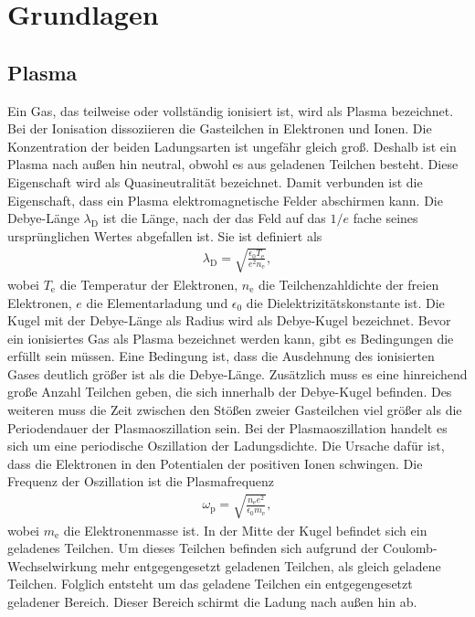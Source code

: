 \section{Grundlagen}
\subsection{Plasma}\label{sec:plasma}
Ein Gas, das teilweise oder vollständig ionisiert ist, wird als Plasma \cite{Plasmaphysik} bezeichnet. Bei der Ionisation dissoziieren die Gasteilchen in Elektronen und Ionen. Die Konzentration der beiden Ladungsarten ist ungefähr gleich groß. Deshalb ist ein Plasma nach außen hin neutral, obwohl es aus geladenen Teilchen besteht. Diese Eigenschaft wird als Quasineutralität bezeichnet. Damit verbunden ist die Eigenschaft, dass ein Plasma elektromagnetische Felder abschirmen kann.
Die Debye-Länge $\lambda_{\mathrm{D}}$ ist die Länge, nach der das Feld auf das $1/e$ fache seines ursprünglichen Wertes abgefallen ist. Sie ist definiert als
\begin{align}
\lambda_{\mathrm{D}}=\sqrt{\frac{\epsilon_0 T_{\mathrm{e}}}{e^2 n_\mathrm{e}}},
\end{align}
wobei $T_{\mathrm{e}}$ die Temperatur der Elektronen, $n_\mathrm{e}$ die Teilchenzahldichte der freien Elektronen, $e$ die Elementarladung und $\epsilon_0$ die Dielektrizitätskonstante ist.
Die Kugel mit der Debye-Länge als Radius wird als Debye-Kugel bezeichnet.
Bevor ein ionisiertes Gas als Plasma bezeichnet werden kann, gibt es Bedingungen die erfüllt sein müssen.  Eine Bedingung ist, dass die Ausdehnung des ionisierten Gases deutlich größer ist als die Debye-Länge. Zusätzlich muss es eine hinreichend große Anzahl Teilchen geben, die sich innerhalb der Debye-Kugel befinden. Des weiteren muss die Zeit zwischen den Stößen zweier Gasteilchen viel größer als die Periodendauer der Plasmaoszillation sein. Bei der Plasmaoszillation handelt es sich um eine periodische Oszillation der Ladungsdichte. Die Ursache dafür ist, dass die Elektronen in den Potentialen der positiven Ionen schwingen. Die Frequenz der Oszillation ist die Plasmafrequenz
\begin{align}
\omega_{\mathrm{p}}=\sqrt{\frac{n_{\mathrm{e}}e^2}{\epsilon_0 m_{\mathrm{e}}}},
\end{align}
wobei $m_{\mathrm{e}}$ die Elektronenmasse ist. 
In der Mitte der Kugel befindet sich ein geladenes Teilchen. Um dieses Teilchen befinden sich aufgrund der Coulomb-Wechselwirkung mehr entgegengesetzt geladenen Teilchen, als gleich geladene Teilchen. Folglich entsteht um das geladene Teilchen ein entgegengesetzt geladener Bereich. Dieser Bereich schirmt die Ladung nach außen hin ab.
